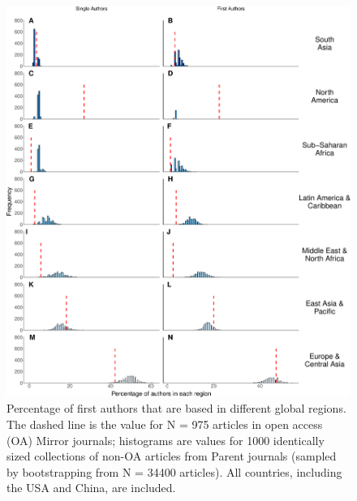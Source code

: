 \documentclass[
  english,
  man]{apa6}
\begin{document}
\begin{figure}

{\centering \includegraphics{Smith_etal_QSS_files/figure-latex/Fig4-1} 

}

\caption{Percentage of first authors that are based in different global regions. The dashed line is the value for N =  975  articles in open access (OA) Mirror journals; histograms are values for 1000 identically sized collections of non-OA articles from Parent journals (sampled by bootstrapping from N =  34400  articles). All countries, including the USA and China, are included.}\label{fig:Fig4}
\end{figure}
\end{document}
